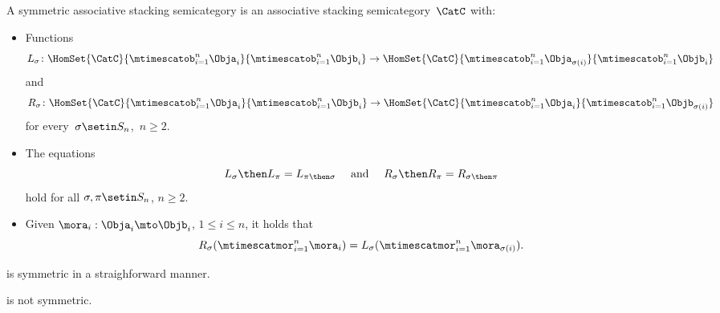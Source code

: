 \begin{ctdefinition}
    \label{def:symmetric-stacking-category}
    A symmetric associative stacking semicategory is an associative stacking semicategory~$\CatC$ with:

    \constit

    \begin{itemize}
        \item Functions
              \begin{equation}
                  L_\sigma \colon \HomSet{\CatC}{\mtimescatob_{i=1}^n \Obja_i}{\mtimescatob_{i=1}^n \Objb_i} \to \HomSet{\CatC}{\mtimescatob_{i=1}^n \Obja_{\sigma(i)}}{\mtimescatob_{i=1}^n \Objb_i}
              \end{equation}
              and
              \begin{equation}
                  R_\sigma \colon \HomSet{\CatC}{\mtimescatob_{i=1}^n \Obja_i}{\mtimescatob_{i=1}^n \Objb_i} \to \HomSet{\CatC}{\mtimescatob_{i=1}^n \Obja_i}{\mtimescatob_{i=1}^n \Objb_{\sigma(i)}}
              \end{equation}
              for every~$\sigma \setin S_n$,~$n \geq 2$.
    \end{itemize}

    \condit

    \begin{itemize}
        \item The equations
              \begin{equation}
                  L_\sigma \then L_\pi = L_{\pi \then \sigma}
                  \quad \text{ and } \quad
                  R_\sigma \then R_\pi = R_{\sigma \then \pi}
              \end{equation}
              hold for all $\sigma, \pi \setin S_n$, $n \geq 2$.
        \item
              Given $\mora_i : \Obja_i \mto \Objb_i$, $1 \leq i \leq n$, it holds that
              \begin{equation}
                  R_\sigma ( \mtimescatmor_{i=1}^n \mora_i ) = L_\sigma(  \mtimescatmor_{i=1}^n \mora_{\sigma(i)} ).
              \end{equation}

    \end{itemize}
\end{ctdefinition}


\begin{example}
    \SetL is symmetric in a straighforward manner.
\end{example}

\begin{lemma}
    \Effects is not symmetric.
\end{lemma}

